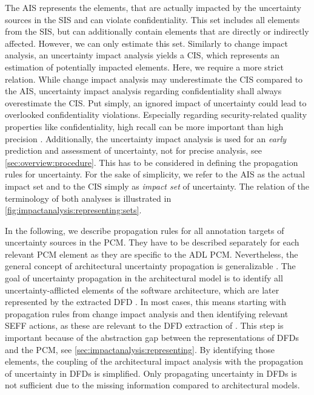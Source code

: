 The \ac{AIS} represents the elements, that are actually impacted by the uncertainty sources in the \ac{SIS} and can violate confidentiality.
This set includes all elements from the \ac{SIS}, but can additionally contain elements that are directly or indirectly affected.
However, we can only estimate this set.
Similarly to change impact analysis, an uncertainty impact analysis yields a \ac{CIS}, which represents an estimation of potentially impacted elements.
Here, we require a more strict relation. 
While change impact analysis may underestimate the \ac{CIS} compared to the \ac{AIS}, uncertainty impact analysis regarding confidentiality shall always overestimate the \ac{CIS}.
Put simply, an ignored impact of uncertainty could lead to overlooked confidentiality violations.
Especially regarding security-related quality properties like confidentiality, high recall can be more important than high precision \cite{hahner_architecture-based_2023}.
Additionally, the uncertainty impact analysis is used for an \emph{early} prediction and assessment of uncertainty, not for precise analysis, see \autoref{sec:overview:procedure}.
This has to be considered in defining the propagation rules for uncertainty.
For the sake of simplicity, we refer to the \ac{AIS} as the actual impact set and to the \ac{CIS} simply as \emph{impact set} of uncertainty.
The relation of the terminology of both analyses is illustrated in \autoref{fig:impactanalysis:representing:sets}.

In the following, we describe propagation rules for all annotation targets of uncertainty sources in the \ac{PCM}.
They have to be described separately for each relevant \ac{PCM} element as they are specific to the \ac{ADL} \ac{PCM}.
Nevertheless, the general concept of architectural uncertainty propagation is generalizable \cite{camara_uncertainty_2024}.
The goal of uncertainty propagation in the architectural model is to identify all uncertainty-afflicted elements of the software architecture, which are later represented by the extracted \ac{DFD} \cite{seifermann_architectural_2022}.
In most cases, this means starting with propagation rules from change impact analysis and then identifying relevant \ac{SEFF} actions, as these are relevant to the \ac{DFD} extraction of \textcite{seifermann_architectural_2022}.
This step is important because of the abstraction gap between the representations of \acp{DFD} and the \ac{PCM}, see \autoref{sec:impactanalysis:representing}.
By identifying those elements, the coupling of the architectural impact analysis with the propagation of uncertainty in \acp{DFD} is simplified.
Only propagating uncertainty in \acp{DFD} is not sufficient due to the missing information compared to architectural models.

